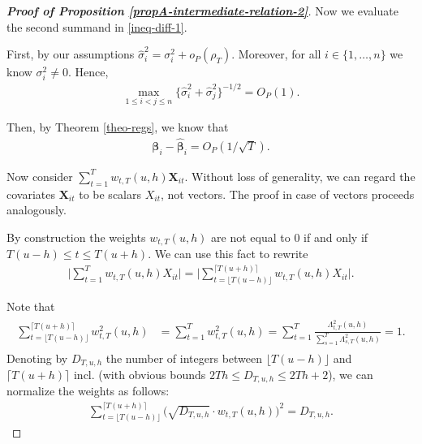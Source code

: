 \documentclass[a4paper,12pt]{article}
\begin{document}
\begin{proof}[\textnormal{\textbf{Proof of Proposition \ref{propA-intermediate-relation-2}}}]
Now we evaluate the second summand in \eqref{ineq-diff-1}.

First, by our assumptions $\widehat{\sigma}_i^2 = \sigma_i^2 + o_P(\rho_T)$. Moreover, for all $i \in \{1, \ldots, n\}$ we know $\sigma_i^2 \neq 0$. Hence, 
\begin{align}\label{ineq-diff-6}
\max_{1\le i < j \le n}\{\widehat{\sigma}_i^2+ \widehat{\sigma}_j^2 \}^{-1/2}  = O_P(1).
\end{align}

Then, by Theorem \ref{theo-regs}, we know that 
\begin{align}\label{ineq-diff-7}
\bm{\beta}_i - \widehat{\bm{\beta}}_i = O_P(1/\sqrt{T}).
\end{align}

Now consider $\sum_{t=1}^T w_{t,T}(u,h) \mathbf{X}_{it}$. Without loss of generality, we can regard the covariates $\mathbf{X}_{it}$ to be scalars $X_{it}$, not vectors. The proof in case of vectors proceeds analogously.

 
By construction the weights $w_{t, T}(u, h)$ are not equal to $0$ if and only if \linebreak $T(u-h) \le t \le T(u+h)$. We can use this fact to rewrite
\begin{align*}
\Big| \sum_{t=1}^T w_{t,T}(u,h) X_{it}   \Big|  = \Big| \sum_{t=\lfloor T(u-h) \rfloor}^{\lceil T(u+h) \rceil} w_{t,T}(u,h)X_{it}   \Big|.
\end{align*}

Note that
\begin{align}\label{sum-weights}
\begin{split}
\sum_{t=\lfloor T(u-h) \rfloor}^{\lceil T(u+h) \rceil} w^2_{t,T}(u,h) &= \sum_{t=1}^T w^2_{t,T}(u,h) = \sum_{t=1}^T\frac{\Lambda^2_{t,T}(u,h)}{\sum\nolimits_{s=1}^T\Lambda^2_{s,T}(u,h) } = 1.
\end{split}
\end{align}
Denoting by $D_{T, u, h}$ the number of integers between $\lfloor T(u-h) \rfloor$ and $\lceil T(u+h) \rceil$ incl. (with obvious bounds $2Th \leq D_{T, u, h} \leq 2Th + 2$), we can normalize the weights as follows:
\begin{align*}
\sum_{t=\lfloor T(u-h) \rfloor}^{\lceil T(u+h) \rceil} \big(\sqrt{D_{T, u, h}}\cdot w_{t,T}(u,h)\big)^2 = D_{T, u, h}.
\end{align*}


\end{proof}
\end{document}

